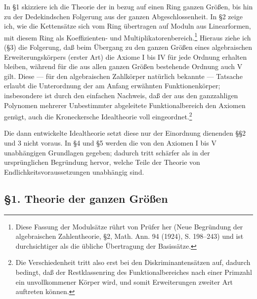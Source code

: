 \documentclass[11pt]{article}
\begin{document}
In §1 skizziere ich die Theorie der in bezug auf einen Ring ganzen Größen, bis hin
zu der Dedekindschen Folgerung aus der ganzen Abgeschlossenheit. In §2 zeige ich,
wie die Kettensätze sich vom Ring übertragen auf Moduln aus Linearformen, mit
diesem Ring als Koeffizienten- und Multiplikatorenbereich.\footnote{Diese Fassung
der Modulsätze rührt von Prüfer her (Neue Begründung der algebraischen
Zahlentheorie, §2, Math. Ann. 94 (1924), S. 198--243) und ist durchsichtiger
als die übliche Übertragung der Basissätze.} Hieraus ziehe ich (§3) die Folgerung,
daß beim Übergang zu den ganzen Größen eines algebraischen Erweiterungskörpers
(erster Art) die Axiome I bis IV für jede Ordnung erhalten bleiben, während für
die aus allen ganzen Größen bestehende Ordnung auch V gilt. Diese — für den
algebraischen Zahlkörper natürlich bekannte — Tatsache erlaubt die Unterordnung
der am Anfang erwähnten Funktionenkörper; insbesondere ist durch den einfachen
Nachweis, daß der aus den ganzzahligen Polynomen mehrerer Unbestimmter abgeleitete
Funktionalbereich den Axiomen genügt, auch die Kroneckersche Idealtheorie voll
eingeordnet.\footnote{Die Verschiedenheit tritt also erst bei den Diskriminantensätzen
auf, dadurch bedingt, daß der Restklassenring des Funktionalbereiches nach einer
Primzahl ein unvollkommener Körper wird, und somit Erweiterungen zweiter Art
auftreten können.}

Die dann entwickelte Idealtheorie setzt diese nur der Einordnung dienenden §§2
und 3 nicht voraus. In §4 und §5 werden die von den Axiomen I bis V unabhängigen
Grundlagen gegeben; dadurch tritt schärfer als in der ursprünglichen Begründung
hervor, welche Teile der Theorie von Endlichkeitsvoraussetzungen unabhängig sind.

\subsection*{§1. Theorie der ganzen Größen}
\end{document}
